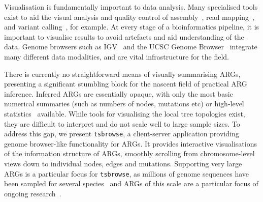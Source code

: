 \documentclass[unnumsec,webpdf,contemporary,large,namedate]{oup-authoring-template}%
\begin{document}
Visualisation is fundamentally important to data analysis.
Many specialised tools exist to aid the visual analysis and 
quality control
of assembly~\citep{wick2015bandage,challis2020blobtoolkit},
read mapping~\citep{robinson2011integrative},
and variant
calling~\citep{robinson2017variant,tollefson2019viva,konig2023divbrowse},
for example.
At every stage of a bioinformatics pipeline, it is important to visualise 
results to avoid artefacts and aid understanding of the data.
Genome browsers such as IGV~\citep{robinson2011integrative} and the 
UCSC Genome Browser~\citep{nassar2023ucsc} integrate many different
data modalities, and are vital infrastructure for the field.


There is currently no straightforward means of visually summarising
ARGs, presenting a significant stumbling block for the nascent 
field of practical ARG inference. Inferred ARGs are essentially opaque,
with only the most basic numerical summaries (such as numbers 
of nodes, mutations etc) or high-level
statistics~\citep{ralph2020efficiently} available. While tools 
for visualising the local tree topologies exist, they are difficult
to interpret and do not scale well to large sample sizes. 
To address this gap, we present \texttt{tsbrowse}, a
client-server application providing genome browser-like 
functionality for ARGs. 
It provides interactive visualisations of the information structure 
of ARGs, smoothly scrolling from chromosome-level views down to 
individual nodes, edges and mutations. Supporting very large ARGs is a 
particular focus for \texttt{tsbrowse}, as millions of genome
sequences have been sampled for several
species~\citep{cesarani2022multibreed,stark2024call,hunt2024addressing}
and ARGs of this scale are a particular focus of ongoing 
research~\citep{kelleher2019inferring,zhang2023biobank,
zhan2023towards,anderson2023on,gunnarsson2024scalable}.
\end{document}
